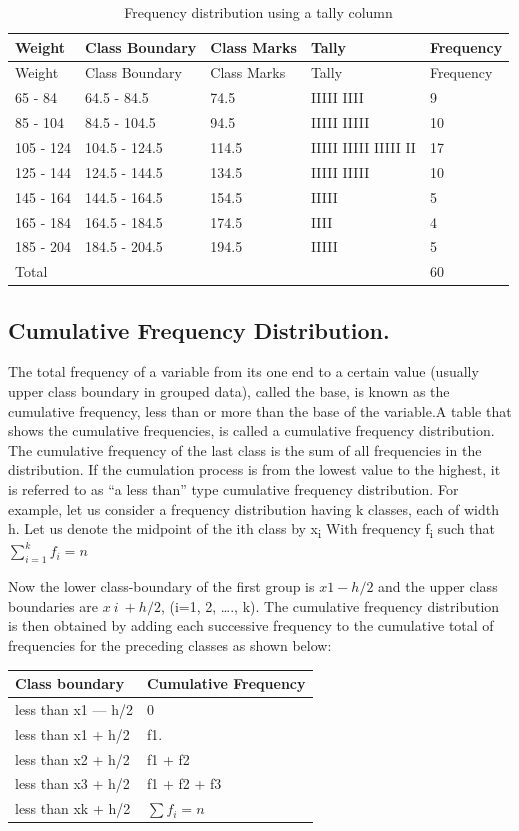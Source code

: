 \documentclass[]{article}
\begin{document}
\begin{longtable}[]{@{}lllll@{}}
\caption{Frequency distribution using a tally column}\tabularnewline
\toprule
Weight & Class Boundary & Class Marks & Tally & Frequency\tabularnewline
\midrule
\endfirsthead
\toprule
Weight & Class Boundary & Class Marks & Tally & Frequency\tabularnewline
\midrule
\endhead
65 - 84 & 64.5 - 84.5 & 74.5 & IIIII IIII & 9\tabularnewline
85 - 104 & 84.5 - 104.5 & 94.5 & IIIII IIIII & 10\tabularnewline
105 - 124 & 104.5 - 124.5 & 114.5 & IIIII IIIII IIIII II &
17\tabularnewline
125 - 144 & 124.5 - 144.5 & 134.5 & IIIII IIIII & 10\tabularnewline
145 - 164 & 144.5 - 164.5 & 154.5 & IIIII & 5\tabularnewline
165 - 184 & 164.5 - 184.5 & 174.5 & IIII & 4\tabularnewline
185 - 204 & 184.5 - 204.5 & 194.5 & IIIII & 5\tabularnewline
Total & & & & 60\tabularnewline
\bottomrule
\end{longtable}

\hypertarget{cumulative-frequency-distribution.}{%
\subsection{Cumulative Frequency
Distribution.}\label{cumulative-frequency-distribution.}}

The total frequency of a variable from its one end to a certain value
(usually upper class boundary in grouped data), called the base, is
known as the cumulative frequency, less than or more than the base of
the variable.A table that shows the cumulative frequencies, is called a
cumulative frequency distribution. The cumulative frequency of the last
class is the sum of all frequencies in the distribution. If the
cumulation process is from the lowest value to the highest, it is
referred to as ``a less than'' type cumulative frequency distribution.
For example, let us consider a frequency distribution having k classes,
each of width h. Let us denote the midpoint of the ith class by
x\textsubscript{i} With frequency f\textsubscript{i} such that
\(\sum_{i=1}^{k} f_i = n\)

Now the lower class-boundary of the first group is \(x1-h/2\) and the
upper class boundaries are \(x~i~ +h/2\), (i=1, 2, \ldots., k). The
cumulative frequency distribution is then obtained by adding each
successive frequency to the cumulative total of frequencies for the
preceding classes as shown below:

\begin{longtable}[]{@{}ll@{}}
\toprule
Class boundary & Cumulative Frequency\tabularnewline
\midrule
\endhead
less than x1 --- h/2 & 0\tabularnewline
less than x1 + h/2 & f1.\tabularnewline
less than x2 + h/2 & f1 + f2\tabularnewline
less than x3 + h/2 & f1 + f2 + f3\tabularnewline
less than xk + h/2 & \(\sum f_i = n\)\tabularnewline
\bottomrule
\end{longtable}
\end{document}
